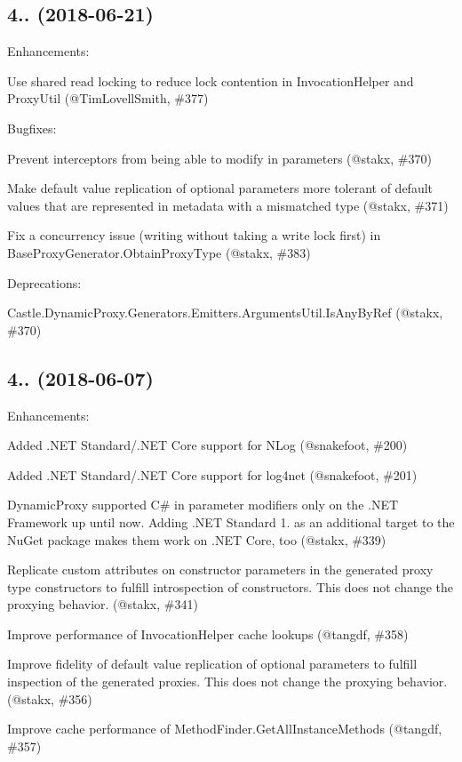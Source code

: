 \subsection*{4.. (2018-\/06-\/21)}

Enhancements\+:
\begin{DoxyItemize}
\item Use shared read locking to reduce lock contention in Invocation\+Helper and Proxy\+Util (@\+Tim\+Lovell\+Smith, \#377)
\end{DoxyItemize}

Bugfixes\+:
\begin{DoxyItemize}
\item Prevent interceptors from being able to modify {\ttfamily in} parameters (@stakx, \#370)
\item Make default value replication of optional parameters more tolerant of default values that are represented in metadata with a mismatched type (@stakx, \#371)
\item Fix a concurrency issue (writing without taking a write lock first) in {\ttfamily Base\+Proxy\+Generator.\+Obtain\+Proxy\+Type} (@stakx, \#383)
\end{DoxyItemize}

Deprecations\+:
\begin{DoxyItemize}
\item {\ttfamily Castle.\+Dynamic\+Proxy.\+Generators.\+Emitters.\+Arguments\+Util.\+Is\+Any\+By\+Ref} (@stakx, \#370)
\end{DoxyItemize}

\subsection*{4.. (2018-\/06-\/07)}

Enhancements\+:
\begin{DoxyItemize}
\item Added .N\+ET Standard/.N\+ET Core support for N\+Log (@snakefoot, \#200)
\item Added .N\+ET Standard/.N\+ET Core support for log4net (@snakefoot, \#201)
\item Dynamic\+Proxy supported C\# {\ttfamily in} parameter modifiers only on the .N\+ET Framework up until now. Adding .N\+ET Standard 1. as an additional target to the Nu\+Get package makes them work on .N\+ET Core, too (@stakx, \#339)
\item Replicate custom attributes on constructor parameters in the generated proxy type constructors to fulfill introspection of constructors. This does not change the proxying behavior. (@stakx, \#341)
\item Improve performance of Invocation\+Helper cache lookups (@tangdf, \#358)
\item Improve fidelity of default value replication of optional parameters to fulfill inspection of the generated proxies. This does not change the proxying behavior. (@stakx, \#356)
\item Improve cache performance of Method\+Finder.\+Get\+All\+Instance\+Methods (@tangdf, \#357)
\end{DoxyItemize}

